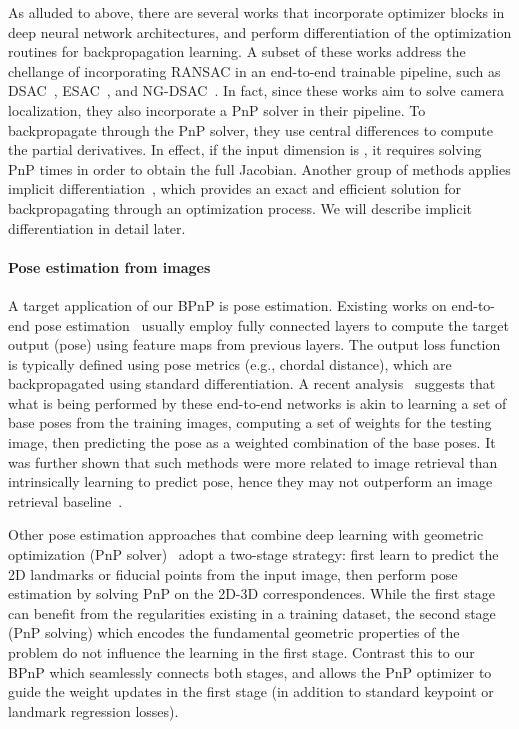 \documentclass[10pt,twocolumn,letterpaper]{article}
\begin{document}
As alluded to above, there are several works that incorporate optimizer blocks in deep neural network architectures, and perform differentiation of the optimization routines for backpropagation learning. A subset of these works address the chellange of incorporating RANSAC in an end-to-end trainable pipeline, such as DSAC~\cite{Brachmann2017dsac}, ESAC~\cite{brachmann2019expert}, and NG-DSAC~\cite{brachmann2019neural}. In fact, since these works aim to solve camera localization, they also incorporate a PnP solver in their pipeline. To backpropagate through the PnP solver, they use central differences to compute the partial derivatives. In effect, if the input dimension is , it requires solving PnP  times in order to obtain the full Jacobian. Another group of methods applies implicit differentiation~\cite{gould2016differentiating,amos2017optnet}, which provides an exact and efficient solution for backpropagating through an optimization process. We will describe implicit differentiation in detail later.

\paragraph{Pose estimation from images}

A target application of our BPnP is pose estimation. Existing works on end-to-end pose estimation~\cite{kendall2015posenet,Kendall2016modelling,kendall2017geometric,brahmbhatt2018geometry,naseer2017deep,walch2017image,wu2017delving} usually employ fully connected layers to compute the target output (pose) using feature maps from previous layers. The output loss function is typically defined using pose metrics (e.g., chordal distance), which are backpropagated using standard differentiation. A recent analysis~\cite{Sattler2019understanding} suggests that what is being performed by these end-to-end networks is akin to learning a set of base poses from the training images, computing a set of weights for the testing image, then predicting the pose as a weighted combination of the base poses. It was further shown that such methods were more related to image retrieval than intrinsically learning to predict pose, hence they may not outperform an image retrieval baseline~\cite{Sattler2019understanding}.

Other pose estimation approaches that combine deep learning with geometric optimization (PnP solver)~\cite{pavlakos20176, rad2017bb8, tekin2018real, Peng2019pvnet, Chen2019satellite} adopt a two-stage strategy: first learn to predict the 2D landmarks or fiducial points from the input image, then perform pose estimation by solving PnP on the 2D-3D correspondences. While the first stage can  benefit from the regularities existing in a training dataset, the second stage (PnP solving) which encodes the fundamental geometric properties of the problem do not influence the learning in the first stage. Contrast this to our BPnP which seamlessly connects both stages, and allows the PnP optimizer to guide the weight updates in the first stage (in addition to standard keypoint or landmark regression losses).
\end{document}
